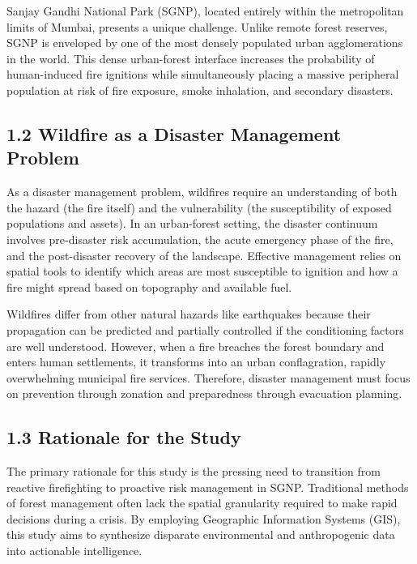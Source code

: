 \documentclass[12pt,a4paper]{article}
\begin{document}
Sanjay Gandhi National Park (SGNP), located entirely within the metropolitan limits of Mumbai, presents a unique challenge. Unlike remote forest reserves, SGNP is enveloped by one of the most densely populated urban agglomerations in the world. This dense urban-forest interface increases the probability of human-induced fire ignitions while simultaneously placing a massive peripheral population at risk of fire exposure, smoke inhalation, and secondary disasters.



\subsection*{1.2 Wildfire as a Disaster Management Problem}

As a disaster management problem, wildfires require an understanding of both the hazard (the fire itself) and the vulnerability (the susceptibility of exposed populations and assets). In an urban-forest setting, the disaster continuum involves pre-disaster risk accumulation, the acute emergency phase of the fire, and the post-disaster recovery of the landscape. Effective management relies on spatial tools to identify which areas are most susceptible to ignition and how a fire might spread based on topography and available fuel.


Wildfires differ from other natural hazards like earthquakes because their propagation can be predicted and partially controlled if the conditioning factors are well understood. However, when a fire breaches the forest boundary and enters human settlements, it transforms into an urban conflagration, rapidly overwhelming municipal fire services. Therefore, disaster management must focus on prevention through zonation and preparedness through evacuation planning.



\subsection*{1.3 Rationale for the Study}

The primary rationale for this study is the pressing need to transition from reactive firefighting to proactive risk management in SGNP. Traditional methods of forest management often lack the spatial granularity required to make rapid decisions during a crisis. By employing Geographic Information Systems (GIS), this study aims to synthesize disparate environmental and anthropogenic data into actionable intelligence.
\end{document}
